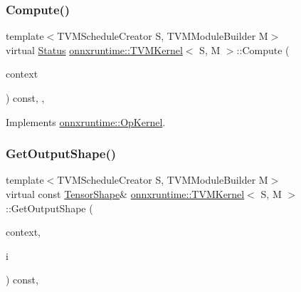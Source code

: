 \subsubsection{\texorpdfstring{Compute()}{Compute()}}
{\footnotesize\ttfamily template$<$T\+V\+M\+Schedule\+Creator S, T\+V\+M\+Module\+Builder M$>$ \\
virtual \mbox{\hyperlink{classonnxruntime_1_1common_1_1Status}{Status}} \mbox{\hyperlink{classonnxruntime_1_1TVMKernel}{onnxruntime\+::\+T\+V\+M\+Kernel}}$<$ S, M $>$\+::Compute (\begin{DoxyParamCaption}\item[{\mbox{\hyperlink{classonnxruntime_1_1OpKernelContext}{Op\+Kernel\+Context}} $\ast$}]{context }\end{DoxyParamCaption}) const\hspace{0.3cm}{\ttfamily [inline]}, {\ttfamily [override]}, {\ttfamily [virtual]}}



Implements \mbox{\hyperlink{classonnxruntime_1_1OpKernel_a9eca8656a78b1b3ab9d3351a12798650}{onnxruntime\+::\+Op\+Kernel}}.

\mbox{\label{classonnxruntime_1_1TVMKernel_abfc9494babe108121334b065a26b8289}} 
\subsubsection{\texorpdfstring{Get\+Output\+Shape()}{GetOutputShape()}}
{\footnotesize\ttfamily template$<$T\+V\+M\+Schedule\+Creator S, T\+V\+M\+Module\+Builder M$>$ \\
virtual const \mbox{\hyperlink{classonnxruntime_1_1TensorShape}{Tensor\+Shape}}\& \mbox{\hyperlink{classonnxruntime_1_1TVMKernel}{onnxruntime\+::\+T\+V\+M\+Kernel}}$<$ S, M $>$\+::Get\+Output\+Shape (\begin{DoxyParamCaption}\item[{\mbox{\hyperlink{classonnxruntime_1_1OpKernelContext}{Op\+Kernel\+Context}} $\ast$}]{context,  }\item[{int}]{i }\end{DoxyParamCaption}) const\hspace{0.3cm}{\ttfamily [protected]}, {}}



